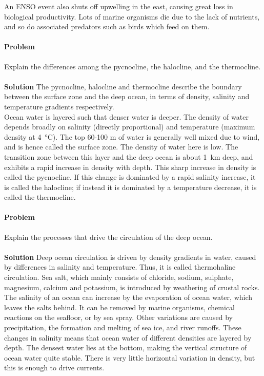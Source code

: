 \documentclass[10pt]{article}
\newcounter{prob}
\def\problem{\stepcounter{prob}\paragraph{Problem \arabic{prob}}}
\def\solution{\\\\\textbf{Solution }}
\begin{document}
        An ENSO event also shuts off upwelling in the east, causing great loss in biological productivity.
        Lots of marine organisms die due to the lack of nutrients, and so do associated predators such as birds which feed on them. \\


        \problem Explain the differences among the pycnocline, the halocline, and the thermocline.
        \solution The pycnocline, halocline and thermocline describe the boundary between the surface zone and the deep ocean, in terms of
        density, salinity and temperature gradients respectively. \\

        Ocean water is layered such that denser water is deeper. The density of water depends broadly on salinity (directly proportional) and
        temperature (maximum density at \SI{4}{\celsius}). The top 60-100 m of water is generally well mixed due to wind, and is hence
        called the surface zone. The density of water here is low. The transition zone between this layer and the deep ocean is about \SI{1}{\kilo\metre}
        deep, and exhibits a rapid increase in density with depth. This sharp increase in density is called the pycnocline. If this change
        is dominated by a rapid salinity increase, it is called the halocline; if instead it is dominated by a temperature decrease, it
        is called the thermocline.


        \problem Explain the processes that drive the circulation of the deep ocean.
        \solution Deep ocean circulation is driven by density gradients in water, caused by differences in salinity and temperature. Thus, it
        is called thermohaline circulation. Sea salt, which mainly consists of chloride, sodium, sulphate, magnesium, calcium and potassium,
        is introduced by weathering of crustal rocks. The salinity of an ocean can increase by the evaporation of ocean water, which leaves the
        salts behind. It can be removed by marine organisms, chemical reactions on the seafloor, or by sea spray. Other variations are 
        caused by precipitation, the formation and melting of sea ice, and river runoffs. These changes in salinity means that ocean water
        of different densities are layered by depth. The densest water lies at the bottom, making the vertical structure of ocean water quite stable.
        There is very little horizontal variation in density, but this is enough to drive currents.\\
\end{document}
